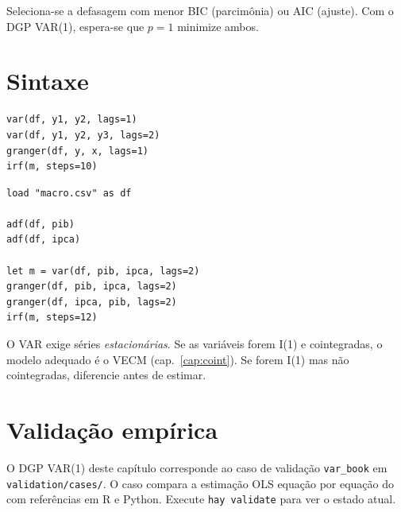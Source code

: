 Seleciona-se a defasagem com menor BIC (parcimônia) ou AIC (ajuste).
Com o DGP VAR(1), espera-se que $p=1$ minimize ambos.

\section{Sintaxe}

\begin{lstlisting}
var(df, y1, y2, lags=1)
var(df, y1, y2, y3, lags=2)
granger(df, y, x, lags=1)
irf(m, steps=10)
\end{lstlisting}

\begin{lstlisting}[caption={Fluxo típico — PIB e inflação}]
load "macro.csv" as df

adf(df, pib)
adf(df, ipca)

let m = var(df, pib, ipca, lags=2)
granger(df, pib, ipca, lags=2)
granger(df, ipca, pib, lags=2)
irf(m, steps=12)
\end{lstlisting}

\begin{nota}
  O VAR exige séries \emph{estacionárias}. Se as variáveis forem I(1) e
  cointegradas, o modelo adequado é o VECM (cap.~\ref{cap:coint}). Se
  forem I(1) mas não cointegradas, diferencie antes de estimar.
\end{nota}

\section{Validação empírica}

O DGP VAR(1) deste capítulo corresponde ao caso de validação
\texttt{var_book} em \texttt{validation/cases/}. O caso compara a estimação
OLS equação por equação do \hayashi{} com referências em R e Python. Execute
\lstinline{hay validate} para ver o estado atual.
